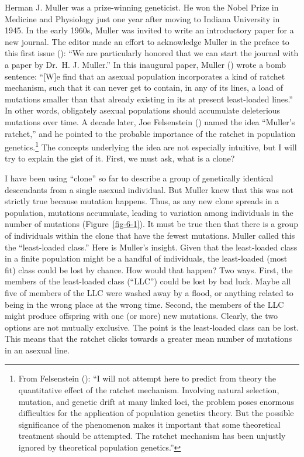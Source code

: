 \documentclass[
  letterpaper,
]{book}
\begin{document}
Herman J. Muller was a prize-winning geneticist. He won the Nobel Prize
in Medicine and Physiology just one year after moving to Indiana
University in 1945. In the early 1960s, Muller was invited to write an
introductory paper for a new journal. The editor made an effort to
acknowledge Muller in the preface to this first issue
(): ``We are particularly honored
that we can start the journal with a paper by Dr.~H. J. Muller.'' In
this inaugural paper, Muller () wrote a
bomb sentence: ``{[}W{]}e find that an asexual population incorporates a
kind of ratchet mechanism, such that it can never get to contain, in any
of its lines, a load of mutations smaller than that already existing in
its at present least-loaded lines.'' In other words, obligately asexual
populations should accumulate deleterious mutations over time. A decade
later, Joe Felsenstein () named the
idea ``Muller's ratchet,'' and he pointed to the probable importance of
the ratchet in population genetics.\footnote{From Felsenstein
  (): ``I will not attempt here to
  predict from theory the quantitative effect of the ratchet mechanism.
  Involving natural selection, mutation, and genetic drift at many
  linked loci, the problem poses enormous difficulties for the
  application of population genetics theory. But the possible
  significance of the phenomenon makes it important that some
  theoretical treatment should be attempted. The ratchet mechanism has
  been unjustly ignored by theoretical population genetics.''} The
concepts underlying the idea are not especially intuitive, but I will
try to explain the gist of it. First, we must ask, what is a clone?

I have been using ``clone'' so far to describe a group of genetically
identical descendants from a single asexual individual. But Muller knew
that this was not strictly true because mutation happens. Thus, as any
new clone spreads in a population, mutations accumulate, leading to
variation among individuals in the number of mutations
(Figure~\ref{fig-6-1}). It must be true then that there is a group of
individuals within the clone that have the fewest mutations. Muller
called this the ``least-loaded class.'' Here is Muller's insight. Given
that the least-loaded class in a finite population might be a handful of
individuals, the least-loaded (most fit) class could be lost by chance.
How would that happen? Two ways. First, the members of the least-loaded
class (``LLC'') could be lost by bad luck. Maybe all five of members of
the LLC were washed away by a flood, or anything related to being in the
wrong place at the wrong time. Second, the members of the LLC might
produce offspring with one (or more) new mutations. Clearly, the two
options are not mutually exclusive. The point is the least-loaded class
can be lost. This means that the ratchet clicks towards a greater mean
number of mutations in an asexual line.
\end{document}
